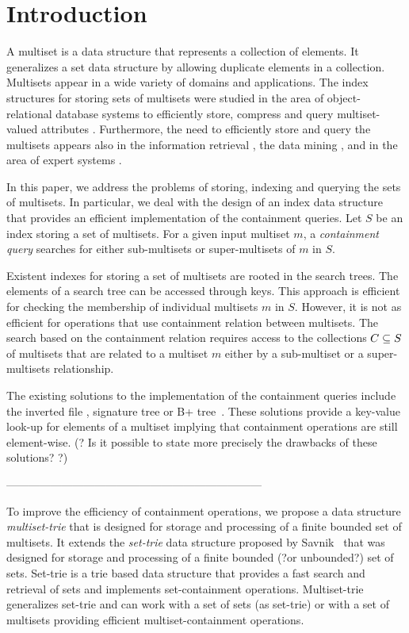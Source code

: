 \section{Introduction} \label{c:introduction}
%
%
A multiset is a data structure that represents a collection of elements. It generalizes a set data structure by allowing duplicate elements in a collection. Multisets appear in a wide variety of domains and applications. The index structures for storing sets of multisets were studied in the area of object-relational database systems to efficiently store, compress and query multiset-valued attributes \cite{bouros2016set,gripon2012compressing,ross2004symmetric,steinruecken2015compressing}. Furthermore, the need to efficiently store and query the multisets appears also in the information retrieval \cite{}, the data mining \cite{}, and in the area of expert systems \cite{}. 
%

In this paper, we address the problems of storing, indexing and querying the sets of multisets. In particular, we deal with the design of an index data structure that provides an efficient implementation of the containment queries. Let $S$ be an index storing a set of multisets. For a given input multiset $m$, a \emph{containment query} searches for either sub-multisets or super-multisets of $m$ in $S$. 

Existent indexes for storing a set of multisets are rooted in the search trees. The elements of a search tree can be accessed through keys. This approach is efficient for checking the membership of individual multisets $m$ in $S$. However, it is not as efficient for operations that use containment relation between multisets. The search based on the containment relation requires access to the collections $C\subseteq\/S$ of multisets that are related to a multiset $m$ either by a sub-multiset or a super-multisets relationship.

The existing solutions to the implementation of the containment queries include the inverted file \cite{}, signature tree \cite{} or B+ tree~\cite{Helmer2003}. These solutions provide a key-value look-up for elements of a multiset implying that containment operations are still element-wise. (? Is it possible to state more precisely the drawbacks of these solutions? ?)
%

---------------------------------------------------------------------

%
To improve the efficiency of containment operations, we propose a data structure \emph{multiset-trie} that is designed for storage and processing of a finite bounded set of multisets. It extends the \emph{set-trie} data structure proposed by Savnik~\cite{savnik2013index} that was designed for storage and processing of a finite bounded (?or unbounded?) set of sets. 
%
Set-trie is a trie based data structure that provides a fast search and retrieval of sets and implements set-containment operations. 
%
Multiset-trie generalizes set-trie and can work with a set of sets (as set-trie) or with 
a set of multisets providing efficient multiset-containment operations.

